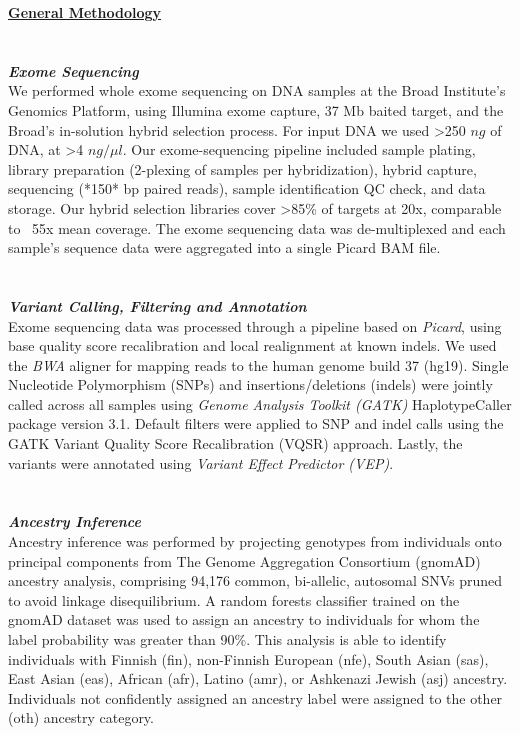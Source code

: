 {\Large \textbf{\underline{General Methodology}}}
\\ \\ \\
{\large \textbf{\textit{Exome Sequencing}}}
\\
We performed whole exome sequencing on DNA samples at the Broad Institute's Genomics Platform, using Illumina exome capture, 37 Mb baited target, and the Broad's in-solution hybrid selection process. For input DNA we used \textgreater250 $ng$ of DNA, at \textgreater4 $ng/\mu l$. Our exome-sequencing pipeline included sample plating, library preparation (2-plexing of samples per hybridization), hybrid capture, sequencing (*150* bp paired reads), sample identification QC check, and data storage. Our hybrid selection libraries cover \textgreater85\% of targets at 20x, comparable to ~55x mean coverage. The exome sequencing data was de-multiplexed and each sample's sequence data were aggregated into a single Picard BAM file.
\\ \\ \\
{\large \textbf{\textit{Variant Calling, Filtering and Annotation}}}
\\
Exome sequencing data was processed through a pipeline based on \textit{Picard}, using base quality score recalibration and local 
realignment at known indels. We used the \textit{BWA} aligner for mapping reads to the human genome build 37 (hg19). Single Nucleotide Polymorphism (SNPs) 
and insertions/deletions (indels) were jointly called across all samples using \textit{Genome Analysis Toolkit (GATK)} HaplotypeCaller package version 3.1. 
Default filters were applied to SNP and indel calls using the GATK Variant Quality Score Recalibration (VQSR) approach. 
Lastly, the variants were annotated using \textit{Variant Effect Predictor (VEP)}.
\\ \\ \\
{\large \textbf{\textit{Ancestry Inference}}}
\\
Ancestry inference was performed by projecting genotypes from individuals onto principal components from The Genome Aggregation Consortium (gnomAD) ancestry analysis, comprising 94,176 common, bi-allelic, autosomal SNVs pruned to avoid linkage disequilibrium. A random forests classifier trained on the gnomAD dataset was used to assign an ancestry to individuals for whom the label probability was greater than 90\%. This analysis is able to identify individuals with Finnish (fin), non-Finnish European (nfe), South Asian (sas), East Asian (eas), African (afr), Latino (amr), or Ashkenazi Jewish (asj) ancestry. Individuals not confidently assigned an ancestry label were assigned to the other (oth) ancestry category. 

